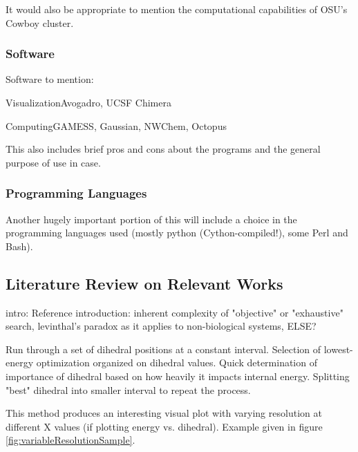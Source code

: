 It would also be appropriate to mention the computational capabilities of OSU's Cowboy cluster.

\subsubsection{Software}

Software to mention: 

Visualization{Avogadro, UCSF Chimera}

Computing{GAMESS, Gaussian, NWChem, Octopus}

This also includes brief pros and cons about the programs and the general purpose of use in case.

\subsubsection{Programming Languages}

Another hugely important portion of this will include a choice in the programming languages used (mostly python (Cython-compiled!), some Perl and Bash).

\subsection{Literature Review on Relevant Works}











intro: 
Reference introduction: inherent complexity of "objective" or "exhaustive" search, levinthal's paradox as it applies to non-biological systems, ELSE?






Run through a set of dihedral positions at a constant interval. 
Selection of lowest-energy optimization organized on dihedral values. 
Quick determination of importance of dihedral based on how heavily it impacts internal energy. 
Splitting "best" dihedral into smaller interval to repeat the process. 

This method produces an interesting visual plot with varying resolution at different X values (if plotting energy vs. dihedral).
Example given in figure \ref{fig:variableResolutionSample}.

